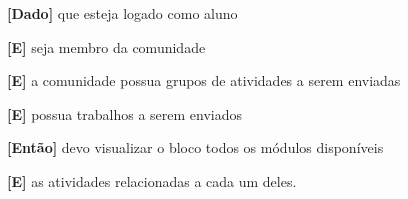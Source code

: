 \begin{enumerate}
\begin{enumerate}
\textbf{[Dado]} que esteja logado como aluno

\textbf{[E]} seja membro da comunidade

\textbf{[E]} a comunidade possua grupos de atividades a serem enviadas

\textbf{[E]} possua trabalhos a serem enviados

\textbf{[Então]} devo visualizar o bloco todos os módulos disponíveis

\textbf{[E]} as atividades relacionadas a cada um deles.

\end{enumerate}

\end{enumerate}